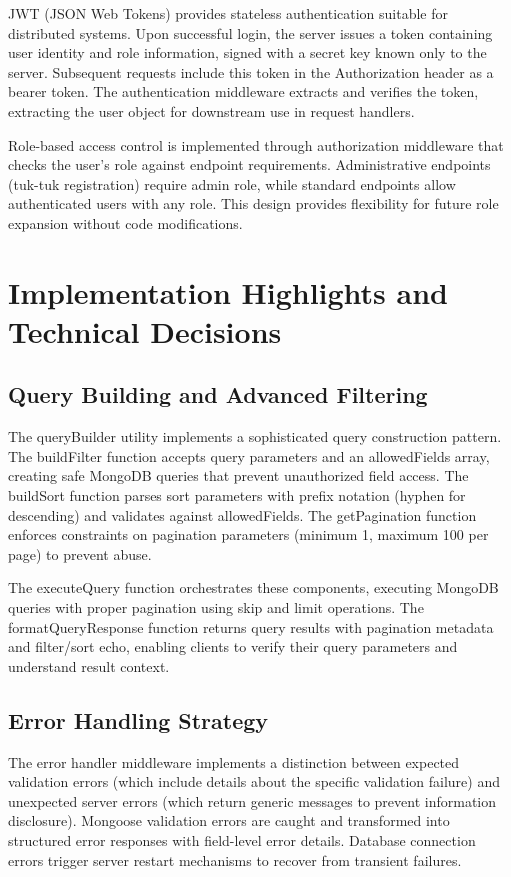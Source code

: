 \documentclass[12pt,a4paper]{article}
\begin{document}
JWT (JSON Web Tokens) provides stateless authentication suitable for distributed systems. Upon successful login, the server issues a token containing user identity and role information, signed with a secret key known only to the server. Subsequent requests include this token in the Authorization header as a bearer token. The authentication middleware extracts and verifies the token, extracting the user object for downstream use in request handlers.

Role-based access control is implemented through authorization middleware that checks the user's role against endpoint requirements. Administrative endpoints (tuk-tuk registration) require admin role, while standard endpoints allow authenticated users with any role. This design provides flexibility for future role expansion without code modifications.

\section{Implementation Highlights and Technical Decisions}

\subsection{Query Building and Advanced Filtering}

The queryBuilder utility implements a sophisticated query construction pattern. The buildFilter function accepts query parameters and an allowedFields array, creating safe MongoDB queries that prevent unauthorized field access. The buildSort function parses sort parameters with prefix notation (hyphen for descending) and validates against allowedFields. The getPagination function enforces constraints on pagination parameters (minimum 1, maximum 100 per page) to prevent abuse.

The executeQuery function orchestrates these components, executing MongoDB queries with proper pagination using skip and limit operations. The formatQueryResponse function returns query results with pagination metadata and filter/sort echo, enabling clients to verify their query parameters and understand result context.

\subsection{Error Handling Strategy}

The error handler middleware implements a distinction between expected validation errors (which include details about the specific validation failure) and unexpected server errors (which return generic messages to prevent information disclosure). Mongoose validation errors are caught and transformed into structured error responses with field-level error details. Database connection errors trigger server restart mechanisms to recover from transient failures.
\end{document}
